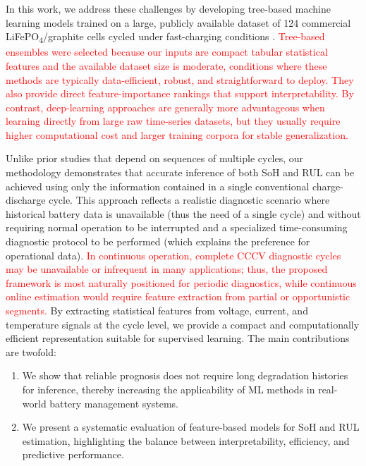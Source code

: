 In this work, we address these challenges by developing tree-based machine learning models trained on a large, publicly available dataset of 124 commercial LiFePO\textsubscript{4}/graphite cells cycled under fast-charging conditions \cite{sev2019}. \textcolor{red}{Tree-based ensembles were selected because our inputs are compact tabular statistical features and the available dataset size is moderate, conditions where these methods are typically data-efficient, robust, and straightforward to deploy. They also provide direct feature-importance rankings that support interpretability. By contrast, deep-learning approaches are generally more advantageous when learning directly from large raw time-series datasets, but they usually require higher computational cost and larger training corpora for stable generalization.}   %

Unlike prior studies that depend on sequences of multiple cycles, our methodology demonstrates that accurate inference of both SoH and RUL can be achieved using only the information contained in a single conventional charge-discharge cycle. This approach reflects a realistic diagnostic scenario where historical battery data is unavailable (thus the need of a single cycle) and without requiring normal operation to be interrupted and a specialized time-consuming diagnostic protocol to be performed (which explains the preference for operational data). \textcolor{red}{In continuous operation, complete CCCV diagnostic cycles may be unavailable or infrequent in many applications; thus, the proposed framework is most naturally positioned for periodic diagnostics, while continuous online estimation would require feature extraction from partial or opportunistic segments.} By extracting statistical features from voltage, current, and temperature signals at the cycle level, we provide a compact and computationally efficient representation suitable for supervised learning. The main contributions are twofold:

\begin{enumerate}[i]
    \item We show that reliable prognosis does not require long degradation histories for inference, thereby increasing the applicability of ML methods in real-world battery management systems.
    \item We present a systematic evaluation of feature-based models for SoH and RUL estimation, highlighting the balance between interpretability, efficiency, and predictive performance.  
\end{enumerate}



